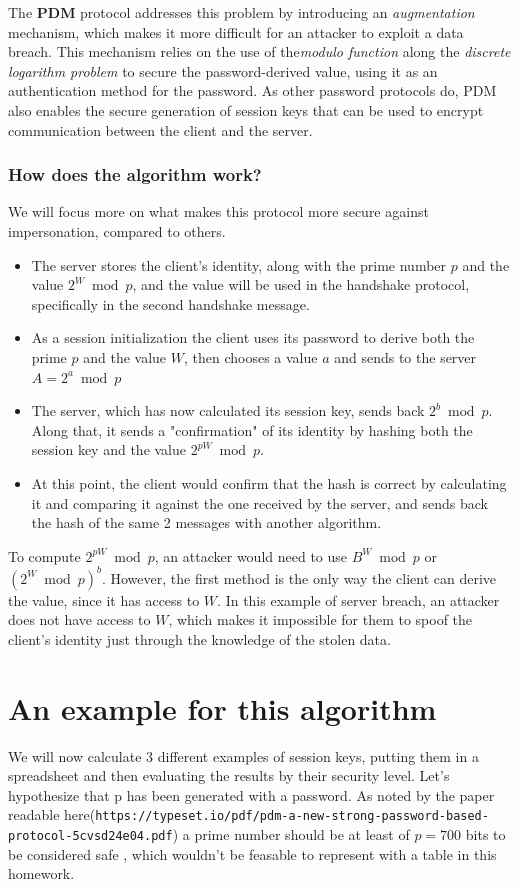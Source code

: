 \documentclass{article}
\begin{document}
The \textbf{PDM} protocol addresses this problem by introducing an \textit{augmentation} mechanism, which makes it more difficult for an attacker to exploit a data breach. This mechanism relies on the use of the\textit{modulo function} along the \textit{discrete logarithm problem} to secure the password-derived value, using it as an authentication method for the password.
As other password protocols do, PDM also enables the secure generation of session keys that can be used to encrypt communication between the client and the server.
\subsubsection*{How does the algorithm work?}
We will focus more on what makes this protocol more secure against impersonation, compared to others.

\begin{itemize}
    \item The server stores the client's identity, along with the prime number \( p \) and the value \( 2^W \bmod p \), and the value will be used in the handshake protocol, specifically in the second handshake message. 
    \item As a session initialization the client uses its password to derive both the prime \(p\) and the value \(W\), then chooses a value \(a\) and sends to the server \(A = 2^a \bmod p\)
    \item The server, which has now calculated its session key, sends back \(2^b \bmod p\). Along that, it sends a "confirmation" of its identity by hashing both the session key and the value \( 2^{pW} \bmod p \).
    \item At this point, the client would confirm that the hash is correct by calculating it and comparing it against the one received by the server, and sends back the hash of the same 2 messages with another algorithm. 

\end{itemize}
To compute \( 2^{pW} \bmod p \), an attacker would need to use \( B^W \bmod p \) or \( (2^W \bmod p)^b \). However, the first method is the only way the client can derive the value, since it has access to \( W \). In this example of server breach, an attacker does not have access to \( W \), which makes it impossible for them to spoof the client's identity just through the knowledge of the stolen data.

\newpage
\section{An example for this algorithm}
We will now calculate 3 different examples of session keys, putting them in a spreadsheet and then evaluating the results by their security level.
Let's hypothesize that p has been generated with a password. As noted by the paper readable here(\texttt{https://typeset.io/pdf/pdm-a-new-strong-password-based-protocol-5cvsd24e04.pdf}) a prime number should be at least of \(p = 700\) bits to be considered safe , which wouldn't be feasable to represent with a table in this homework.
\end{document}
